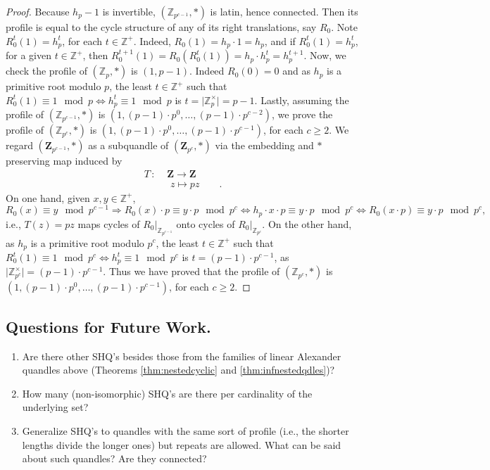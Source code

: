 \documentclass{article}
\begin{document}
\begin{proof}
Because $h_p-1$ is invertible, $(\mathbb{Z}_{p^{c-1}},*)$ is latin, hence connected. Then its profile is equal to the cycle structure of any of its right translations, say $R_0$. Note $R_0^t(1)=h_p^t$, for each $t\in\mathbb{Z}^+$. Indeed, $R_0(1)=h_p\cdot1=h_p$, and if $R_0^t(1)=h_p^t$, for a given $t\in\mathbb{Z}^+$, then $R_0^{t+1}(1)=R_0(R_0^t(1))=h_p\cdot h_p^t=h_p^{t+1}$. Now, we check the profile of $(\mathbb{Z}_p,*)$ is $(1,p-1)$. Indeed $R_0(0)=0$ and as $h_p$ is a primitive root modulo $p$, the least $t\in\mathbb{Z}^+$ such that $R_0^t(1)\equiv 1\mod p\Leftrightarrow h_p^t\equiv1\mod p$ is $t=\rvert\mathbb{Z}_p^\times\rvert=p-1$. Lastly, assuming the profile of $(\mathbb{Z}_{p^{c-1}},*)$ is $(1,(p-1)\cdot p^0,\dots,(p-1)\cdot p^{c-2})$, we prove the profile of $(\mathbb{Z}_{p^c},*)$ is $(1,(p-1)\cdot p^0,\dots,(p-1)\cdot p^{c-1})$, for each $c\geq2$. We regard $(\mathbf{Z}_{p^{c-1}},*)$ as a subquandle of $(\mathbf{Z}_{p^{c}},*)$ via the embedding and $\ast$ preserving map induced by  \begin{align*}T\,:\,\, &\mathbf{Z}\longrightarrow \mathbf{Z}\\
&\,\,z\mapsto pz \qquad .\end{align*}On one hand, given $x,y\in\mathbb{Z}^+$, \[R_0(x)\equiv y\mod p^{c-1}\Rightarrow R_0(x)\cdot p\equiv y\cdot p\mod p^c\Leftrightarrow h_p\cdot x\cdot p\equiv y\cdot p\mod p^c\Leftrightarrow R_0(x\cdot p)\equiv y\cdot p\mod p^c,\] i.e., $T(z)=pz$ maps cycles of $R_0\vert_{\mathbb{Z}_{p^{c-1}}}$ onto cycles of $R_0\vert_{\mathbb{Z}_{p^c}}$. On the other hand, as $h_p$ is a primitive root modulo $p^c$, the least $t\in\mathbb{Z}^+$ such that $R_0^t(1)\equiv 1\mod p^c\Leftrightarrow h_p^t\equiv1\mod p^c$ is $t=(p-1)\cdot p^{c-1}$, as $\rvert\mathbb{Z}_{p^c}^\times\rvert=(p-1)\cdot p^{c-1}$. Thus we have proved that the profile of $(\mathbb{Z}_{p^{c}},*)$ is $(1,(p-1)\cdot p^0,\dots,(p-1)\cdot p^{c-1})$, for each $c\geq2$.\par
\end{proof}

\bigbreak

\subsection{Questions for Future Work.}



\begin{enumerate}[1.]
\item Are there  other SHQ's besides those from the families of linear  Alexander quandles above (Theorems \ref{thm:nestedcyclic} and \ref{thm:infnestedqdles})?

\item How many (non-isomorphic) SHQ's are there per cardinality of the underlying set?

\item Generalize SHQ's to quandles with the same sort of profile (i.e., the shorter lengths divide the longer ones) but repeats are allowed. What can be said about  such  quandles? Are they connected?



\end{enumerate}
\end{document}
